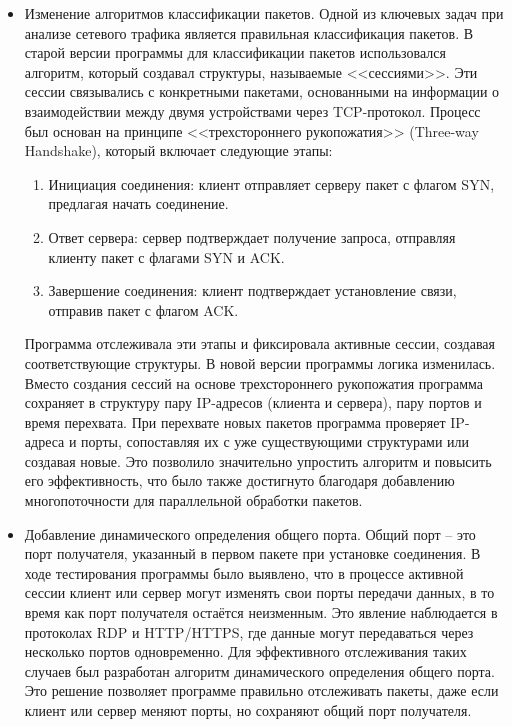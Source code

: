 \documentclass[bachelor, och, coursework]{SCWorks}
\begin{document}
\begin{itemize}
  \item Изменение алгоритмов классификации пакетов. Одной из ключевых задач при анализе сетевого трафика является правильная 
  классификация пакетов. В старой версии программы для классификации пакетов использовался алгоритм, который создавал структуры, называемые <<сессиями>>. 
  Эти сессии связывались с конкретными пакетами, основанными на информации о взаимодействии между двумя устройствами через TCP-протокол. Процесс был 
  основан на принципе <<трехстороннего рукопожатия>> (Three-way Handshake), который включает следующие этапы:
  \begin{enumerate}
    \item Инициация соединения: клиент отправляет серверу пакет с флагом SYN, предлагая начать соединение.
    \item Ответ сервера: сервер подтверждает получение запроса, отправляя клиенту пакет с флагами SYN и ACK.
    \item Завершение соединения: клиент подтверждает установление связи, отправив пакет с флагом ACK.
  \end{enumerate}

  Программа отслеживала эти этапы и фиксировала активные сессии, создавая соответствующие структуры. В новой версии программы логика изменилась. 
  Вместо создания сессий на основе трехстороннего рукопожатия программа сохраняет в структуру пару IP-адресов (клиента и сервера), пару портов и время 
  перехвата. При перехвате новых пакетов программа проверяет IP-адреса и порты, сопоставляя их с уже существующими структурами или создавая новые. Это 
  позволило значительно упростить алгоритм и повысить его эффективность, что было также достигнуто благодаря добавлению многопоточности для параллельной 
  обработки пакетов.

  \item Добавление динамического определения общего порта. Общий порт -- это порт получателя, указанный в первом пакете при установке соединения. 
  В ходе тестирования программы было выявлено, что в процессе активной сессии клиент или сервер могут изменять свои порты передачи данных, в то время как 
  порт получателя остаётся неизменным. Это явление наблюдается в протоколах RDP и HTTP/HTTPS, где данные могут передаваться через несколько портов 
  одновременно. Для эффективного отслеживания таких случаев был разработан алгоритм динамического определения общего порта. Это решение позволяет 
  программе правильно отслеживать пакеты, даже если клиент или сервер меняют порты, но сохраняют общий порт получателя.


\end{itemize}
\end{document}
